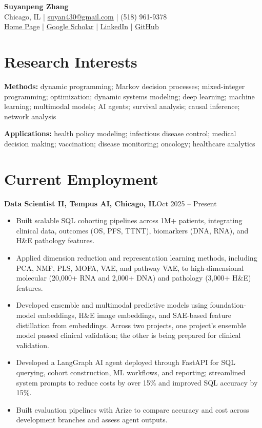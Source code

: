 \documentclass[11pt,letterpaper]{article}
\newcommand{\entry}[2]{\textbf{#1}\hfill #2\par}
\begin{document}
\begin{center}
  {\LARGE\bfseries Suyanpeng Zhang}\\[4pt]
  Chicago, IL \;|\; \href{mailto:suyan430@gmail.com}{suyan430@gmail.com} \;|\; (518) 961-9378\\
  \href{https://suyanpengzhang.github.io/}{Home Page} \;|\;
  \href{https://scholar.google.com/citations?user=c8Jx3mAAAAAJ&hl=en}{Google Scholar} \;|\;
  \href{https://www.linkedin.com/in/suyanpengzhang/}{LinkedIn} \;|\;
  \href{https://github.com/suyanpengzhang}{GitHub}
\end{center}

\section{Research Interests}
\textbf{Methods:} dynamic programming; Markov decision processes; mixed-integer programming; optimization;
dynamic systems modeling; deep learning; machine learning; multimodal models; AI agents; survival analysis;
causal inference; network analysis

\textbf{Applications:} health policy modeling; infectious disease control; medical decision making; vaccination;
disease monitoring; oncology; healthcare analytics

\section{Current Employment}
\entry{Data Scientist II, Tempus AI, Chicago, IL}{Oct 2025 -- Present}
\begin{itemize}
  \item Built scalable SQL cohorting pipelines across 1M+ patients, integrating clinical data, outcomes (OS, PFS,
        TTNT), biomarkers (DNA, RNA), and H\&E pathology features.
  \item Applied dimension reduction and representation learning methods, including PCA, NMF, PLS, MOFA, VAE, and
        pathway VAE, to high-dimensional molecular (20,000+ RNA and 2,000+ DNA) and pathology (3,000+ H\&E)
        features.
  \item Developed ensemble and multimodal predictive models using foundation-model embeddings, H\&E image
        embeddings, and SAE-based feature distillation from embeddings. Across two projects, one project's
        ensemble model passed clinical validation; the other is being prepared for clinical validation.
  \item Developed a LangGraph AI agent deployed through FastAPI for SQL querying, cohort construction, ML
        workflows, and reporting; streamlined system prompts to reduce costs by over 15\% and improved SQL
        accuracy by 15\%.
  \item Built evaluation pipelines with Arize to compare accuracy and cost across development branches and
        assess agent outputs.
\end{itemize}
\end{document}
